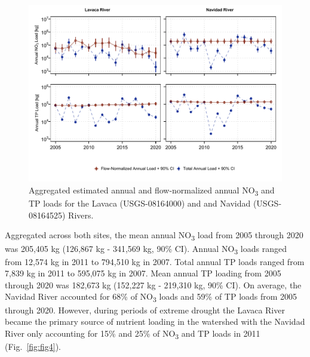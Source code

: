 \documentclass[fleqn,10pt,lineno]{wlpeerj} %
\begin{document}
\begin{figure}

{\centering \includegraphics[width=1\linewidth,]{Schramm-2023-08-PeerJ_files/figure-latex/fig3} 

}

\caption{Aggregated estimated annual and flow-normalized annual NO\textsubscript{3} and TP loads for the Lavaca (USGS-08164000) and and Navidad (USGS-08164525) Rivers.}\label{fig:fig3}
\end{figure}

Aggregated across both sites, the mean annual NO\textsubscript{3} load
from 2005 through 2020 was 205,405 kg (126,867 kg - 341,569 kg, 90\%
CI). Annual NO\textsubscript{3} loads ranged from 12,574 kg in 2011 to
794,510 kg in 2007. Total annual TP loads ranged from 7,839 kg in 2011
to 595,075 kg in 2007. Mean annual TP loading from 2005 through 2020 was
182,673 kg (152,227 kg - 219,310 kg, 90\% CI). On average, the Navidad
River accounted for 68\% of NO\textsubscript{3} loads and 59\% of TP
loads from 2005 through 2020. However, during periods of extreme drought
the Lavaca River became the primary source of nutrient loading in the
watershed with the Navidad River only accounting for 15\% and 25\% of
NO\textsubscript{3} and TP loads in 2011 (Fig.~\ref{fig:fig4}).
\end{document}

